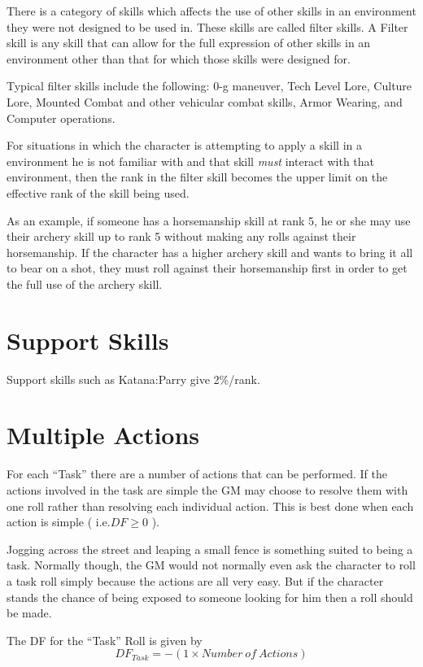 There is a category of skills which affects the use of other skills 
in an environment they were not designed to be used in. These skills 
are called filter skills. A Filter skill is any skill that can allow 
for the full expression of other skills in an environment other than 
that for which those skills were designed for.

Typical filter skills include the following: 0-g maneuver, Tech 
Level Lore, Culture Lore, Mounted Combat and other vehicular combat 
skills, Armor Wearing, and Computer operations.

For situations in which the character is attempting to apply a skill 
in a environment he is not familiar with and that skill {\em must }
interact with that environment, then the rank in the filter skill 
becomes the upper limit on the effective rank of the skill being 
used.

As an example, if someone has a horsemanship skill at rank 5, he or she
may use their archery skill up to rank 5 without making any rolls
against their horsemanship. If the character has a higher archery skill
and wants to bring it all to bear on a shot, they must roll against
their horsemanship first in order to get the full use of the archery
skill.

\section{Support Skills}

Support skills such as Katana:Parry give 2\%/rank.

\section{Multiple Actions}

For each ``Task'' there are a number of actions that can be performed. 
If the actions involved in the task are simple the GM may choose to
resolve  them with one roll rather than resolving each individual
action. This is best done when each action is simple ( i.e.\(  DF \geq
0\) ). 

Jogging across the street and leaping a small fence is something suited
to being a task. Normally though, the GM would not normally even ask
the character to roll a task roll simply because the actions are all
very easy. But if the character stands the chance of being exposed to
someone looking for him then a roll should be made. 

The DF for the ``Task'' Roll is given by \[ DF_{Task} =  - ( 1
\times {Number\ of\ Actions }) \]  

